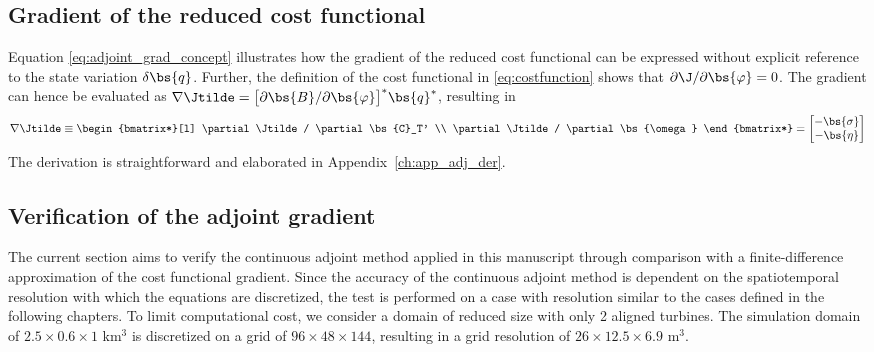	\subsection{Gradient of the reduced cost functional}\label{sec:problem_gradient2}
	Equation \eqref{eq:adjoint_grad_concept} illustrates how the gradient of the reduced cost functional can be expressed without explicit reference to the state variation $\delta \bs{q}$. Further, the definition of the cost functional in \eqref{eq:costfunction} shows that $\partial \J / \partial \bs{\varphi} = 0$. The gradient can hence be evaluated as $\nabla \Jtilde = \big[ \partial \bs{B} / \partial \bs{\varphi}  \big]^* \bs{q}^*$, resulting in
	\begin{equation}\label{eq:problem_gradient}
		\nabla \Jtilde \equiv 
		\begin{bmatrix*}[l]
			\partial \Jtilde / \partial \bs{C}_T' \\
			\partial \Jtilde / \partial \bs{\omega} 
		\end{bmatrix*} = 
		\begin{bmatrix}
			- \bs{\sigma}\\
			- \bs{\eta}
		\end{bmatrix}
	\end{equation}
	The derivation is straightforward and elaborated in Appendix~\ref{ch:app_adj_der}.
	
	\subsection{Verification of the adjoint gradient}\label{sec:problem_verification}
	The current section aims to verify the continuous adjoint method applied in this manuscript through comparison with a finite-difference approximation of the cost functional gradient. Since the accuracy of the continuous adjoint method is dependent on the spatiotemporal resolution with which the equations are discretized, the test is performed on a case with resolution similar to the cases defined in the following chapters. To limit computational cost, we consider a domain of reduced size with only 2 aligned turbines. The simulation domain of $2.5 \times 0.6 \times 1$ km$^3$ is discretized on a grid of $96 \times 48 \times 144$, resulting in a grid resolution of $26 \times 12.5 \times 6.9$ m$^3$. 
	
